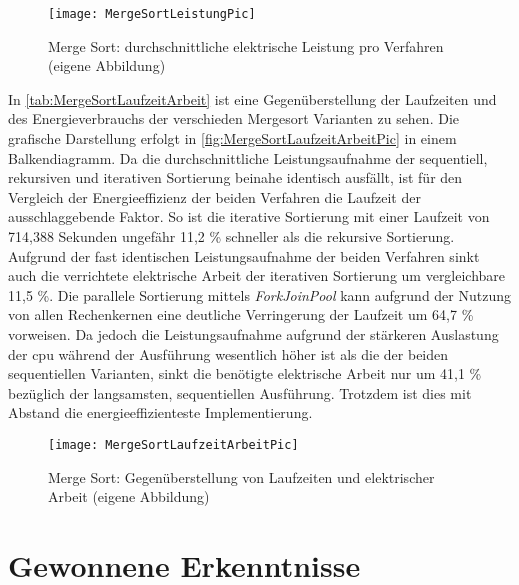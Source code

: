 \begin{figure}[H]
	\begin{center}	 
	\texttt{[image: MergeSortLeistungPic]}
	\caption{Merge Sort: durchschnittliche elektrische Leistung pro Verfahren (eigene Abbildung)}
	\label{fig:MergeSortLeistungPic}
	\end{center}
\end{figure}
In \autoref{tab:MergeSortLaufzeitArbeit} ist eine Gegenüberstellung der Laufzeiten und des Energieverbrauchs der verschieden Mergesort Varianten zu sehen. Die grafische Darstellung erfolgt in \autoref{fig:MergeSortLaufzeitArbeitPic} in einem Balkendiagramm. Da die durchschnittliche Leistungsaufnahme der sequentiell, rekursiven und iterativen Sortierung beinahe identisch ausfällt, ist für den Vergleich der Energieeffizienz der beiden Verfahren die Laufzeit der ausschlaggebende Faktor. So ist die iterative Sortierung mit einer Laufzeit von 714,388 Sekunden ungefähr 11,2 \% schneller als die rekursive  Sortierung. Aufgrund der fast identischen Leistungsaufnahme der beiden Verfahren sinkt auch die verrichtete elektrische Arbeit der iterativen Sortierung um vergleichbare 11,5 \%. Die parallele Sortierung mittels \emph{ForkJoinPool} kann aufgrund der Nutzung von allen Rechenkernen eine deutliche Verringerung der Laufzeit um 64,7 \% vorweisen. Da jedoch die Leistungsaufnahme aufgrund der stärkeren Auslastung der \ac{cpu} während der Ausführung wesentlich höher ist als die der beiden sequentiellen Varianten, sinkt die benötigte elektrische Arbeit nur um 41,1 \% bezüglich der langsamsten, sequentiellen Ausführung. Trotzdem ist dies mit Abstand die energieeffizienteste Implementierung.



\begin{figure}[H]
	\begin{center}	 
	\texttt{[image: MergeSortLaufzeitArbeitPic]}
	\caption{Merge Sort: Gegenüberstellung von Laufzeiten und elektrischer Arbeit (eigene Abbildung)}
	\label{fig:MergeSortLaufzeitArbeitPic} 
	\end{center}
\end{figure}

\section{Gewonnene Erkenntnisse}


